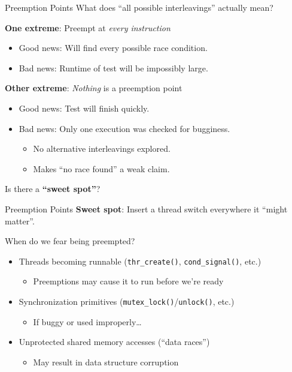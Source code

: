 \documentclass[xcolor=dvipsnames]{beamer}
\begin{document}
\begin{frame}{Preemption Points}
	What does ``all possible interleavings'' actually mean?

	\linegap
	{\bf One extreme}: Preempt at {\em every instruction}
	\begin{itemize}
		\item Good news: Will find every possible race condition.
		\item Bad news: Runtime of test will be impossibly large.
	\end{itemize}
	\linegap

	{\bf Other extreme}: {\em Nothing} is a preemption point
	\begin{itemize}
		\item Good news: Test will finish quickly.
		\item Bad news: Only one execution was checked for bugginess.
		\begin{itemize}
			\item No alternative interleavings explored.
			\item Makes ``no race found'' a weak claim.
		\end{itemize}
	\end{itemize}
	\linegap

	Is there a {\bf ``sweet spot''}?
\end{frame}

\begin{frame}{Preemption Points}
	\textbf{Sweet spot}: Insert a thread switch everywhere it ``might matter''.

	\linegap
	When do we fear being preempted?
	\begin{itemize}
		\item Threads becoming runnable (\texttt{thr\_create()}, \texttt{cond\_signal()}, etc.)
			\begin{itemize}
				\item Preemptions may cause it to run before we're ready
			\end{itemize}
		\item Synchronization primitives (\texttt{mutex\_lock()}/\texttt{unlock()}, etc.)
			\begin{itemize}
				\item If buggy or used improperly\ldots
			\end{itemize}
		\item Unprotected shared memory accesses (``data races'')%
			\begin{itemize}
				\item May result in data structure corruption
			\end{itemize}
	\end{itemize}

\end{frame}
\end{document}
